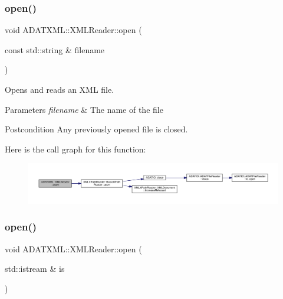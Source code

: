 \subsubsection{\texorpdfstring{open()}{open()}\hspace{0.1cm}{\footnotesize\ttfamily [2/6]}}
{\footnotesize\ttfamily void A\+D\+A\+T\+X\+M\+L\+::\+X\+M\+L\+Reader\+::open (\begin{DoxyParamCaption}\item[{const std\+::string \&}]{filename }\end{DoxyParamCaption})\hspace{0.3cm}{\ttfamily [inline]}}



Opens and reads an X\+ML file. 


\begin{DoxyParams}{Parameters}
{\em filename} & The name of the file \\
\hline
\end{DoxyParams}
\begin{DoxyPostcond}{Postcondition}
Any previously opened file is closed. 
\end{DoxyPostcond}
Here is the call graph for this function\+:
\nopagebreak
\begin{figure}[H]
\begin{center}
\leavevmode
\includegraphics[width=350pt]{db/d3f/classADATXML_1_1XMLReader_ad5dcbd08800bc67ac4a91f93cb1504b0_cgraph}
\end{center}
\end{figure}
\mbox{\label{classADATXML_1_1XMLReader_a7938cc7e08b0381e467eb7b916cbbd97}} 
\subsubsection{\texorpdfstring{open()}{open()}\hspace{0.1cm}{\footnotesize\ttfamily [3/6]}}
{\footnotesize\ttfamily void A\+D\+A\+T\+X\+M\+L\+::\+X\+M\+L\+Reader\+::open (\begin{DoxyParamCaption}\item[{std\+::istream \&}]{is }\end{DoxyParamCaption})\hspace{0.3cm}{\ttfamily [inline]}}



